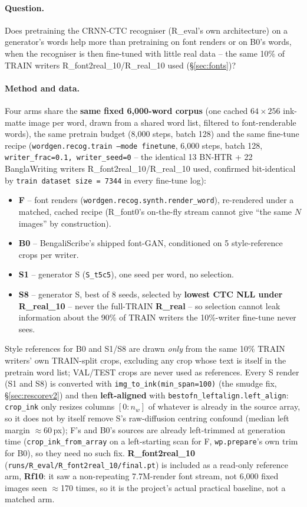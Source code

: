 \documentclass[10.5pt,a4paper]{article}
\newcommand{\fp}[1]{\nolinkurl{#1}}
\begin{document}
\paragraph{Question.} Does pretraining the CRNN-CTC recogniser (R\_eval's own architecture) on a generator's words help more
than pretraining on font renders or on B0's words, when the recogniser is then fine-tuned with little real data -- the same
10\% of TRAIN writers R\_font2real\_10/R\_real\_10 used (\S\ref{sec:fonts})?

\paragraph{Method and data.} Four arms share the \textbf{same fixed 6,000-word corpus} (one cached $64{\times}256$ ink-matte
image per word, drawn from a shared word list, filtered to font-renderable words), the same pretrain budget (8,000 steps,
batch 128) and the same fine-tune recipe (\texttt{wordgen.recog.train --mode finetune}, 6,000 steps, batch 128,
\texttt{writer\_frac=0.1, writer\_seed=0} -- the identical 13 BN-HTR + 22 BanglaWriting writers R\_font2real\_10/R\_real\_10
used, confirmed bit-identical by \texttt{train dataset size = 7344} in every fine-tune log):
\begin{itemize}
\item \textbf{F} -- font renders (\texttt{wordgen.recog.synth.render\_word}), re-rendered under a matched, cached recipe
  (R\_font0's on-the-fly stream cannot give ``the same $N$ images'' by construction).
\item \textbf{B0} -- BengaliScribe's shipped font-GAN, conditioned on 5 style-reference crops per writer.
\item \textbf{S1} -- generator S (\texttt{S\_t5c5}), one seed per word, no selection.
\item \textbf{S8} -- generator S, best of 8 seeds, selected by \textbf{lowest CTC NLL under R\_real\_10} -- never the
  full-TRAIN \textbf{R\_real} -- so selection cannot leak information about the 90\% of TRAIN writers the 10\%-writer
  fine-tune never sees.
\end{itemize}
Style references for B0 and S1/S8 are drawn \emph{only} from the same 10\% TRAIN writers' own TRAIN-split crops, excluding
any crop whose text is itself in the pretrain word list; VAL/TEST crops are never used as references. Every S render
(S1 and S8) is converted with \texttt{img\_to\_ink(min\_span=100)} (the smudge fix, \S\ref{sec:rescorev2}) and then
\textbf{left-aligned} with \texttt{bestofn\_leftalign.left\_align}: \texttt{crop\_ink} only resizes columns
$[0{:}n_w]$ of whatever is already in the source array, so it does not by itself remove S's raw-diffusion centring
confound (median left margin $\approx$60\,px); F's and B0's sources are already left-trimmed at generation time
(\texttt{crop\_ink\_from\_array} on a left-starting scan for F, \texttt{wp.prepare}'s own trim for B0), so they need no
such fix. \textbf{R\_font2real\_10} (\fp{runs/R_eval/R_font2real_10/final.pt}) is included as a read-only reference arm,
\textbf{Rf10}: it saw a non-repeating 7.7M-render font stream, not 6,000 fixed images seen $\approx$170 times, so it is the
project's actual practical baseline, not a matched arm.
\end{document}
